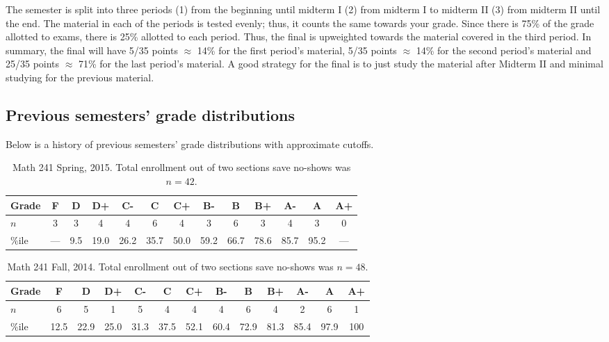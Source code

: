 \documentclass[12pt]{article}
\begin{document}
The semester is split into three periods (1) from the beginning until midterm I (2) from midterm I to midterm II (3) from midterm II until the end. The material in each of the periods is tested evenly; thus, it counts the same towards your grade. Since there is 75\% of the grade allotted to exams, there is 25\% allotted to each period. Thus, the final is upweighted towards the material covered in the third period. In summary, the final will have 5/35 points $\approx$ 14\% for the first period's material, 5/35 points $\approx$ 14\% for the second period's material and 25/35 points $\approx$ 71\% for the last period's material. A good strategy for the final is to just study the material after Midterm II and minimal studying for the previous material.

\subsection*{Previous semesters' grade distributions}

Below is a history of previous semesters' grade distributions with approximate cutoffs.

\begin{table}[htp]
\centering
\begin{tabular}{l|cccccccccccc}
Grade & F   & D      & D+   & C-    & C     & C+    & B-    & B     & B+   & A-    & A      & A+ \\ \hline
$n$   & 3    & 3      & 4      & 4      & 6     & 4      & 3     & 6      & 3     & 4      & 3      & 0 \\
\%ile & --- & 9.5  &  19.0 & 26.2 & 35.7 & 50.0 & 59.2 & 66.7 & 78.6 &  85.7 & 95.2 & --- \\ \hline
\end{tabular}
\caption{Math 241 Spring, 2015. Total enrollment out of two sections save no-shows was $n=42$.}
\end{table}

\begin{table}[h]
\centering
\begin{tabular}{l|cccccccccccc}
Grade & F & D & D+ & C- & C & C+ & B- & B & B+ & A- & A & A+ \\ \hline
$n$ & 6 & 5 & 1 & 5 & 4 & 4 & 4 & 6 & 4 & 2 & 6 & 1 \\
\%ile & 12.5 & 22.9 &  25.0 & 31.3 & 37.5 & 52.1 & 60.4 & 72.9 & 81.3 &  85.4 & 97.9 & 100 \\ \hline
\end{tabular}
\caption{Math 241 Fall, 2014. Total enrollment out of two sections save no-shows was $n=48$.}
\end{table}
\end{document}
